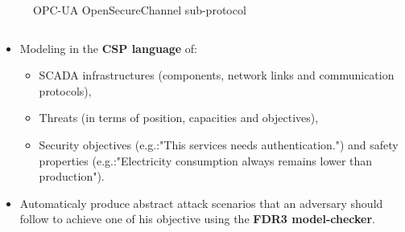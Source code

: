 \documentclass{beamer}
\newcommand{\opcua}{OPC-UA\xspace}
\newcommand{\eg}{e.g.:\xspace}
\begin{document}
\begin{frame}[fragile]{}
\begin{tcolorbox}[adjusted title={\centering\large Formal Analysis of SCADA Protocols}]
\begin{columns}[T]
\begin{column}{.65\textwidth}
\begin{tcolorbox}
\begin{columns}[T]
\begin{column}{.55\textwidth}
\begin{figure}[htb]
                                \caption{\opcua OpenSecureChannel sub-protocol}
                            \end{figure}
                        \end{column}
                    \end{columns}
                \end{tcolorbox}
            \end{column}
        \end{columns}
    \end{tcolorbox}
    \vfill
    \begin{tcolorbox}[adjusted title={\centering\large Smart-Fuzzing of SCADA Systems}]
        \vspace{.5em}
        \begin{columns}[T]
            \begin{column}{.35\textwidth}
                \begin{tcolorbox}[
                colback=white, %
                colframe=normalTitleBlockColor, %
                colframe=gray!20, %
                boxrule=1mm,
                coltext=black, %
                coltitle=black, %
                bottom=2mm,
                equal height group=C,
                valign = center,
                adjusted title={\large Objectives}]
                    \vspace{.5em}
                    \begin{itemize}
                        \item Modeling in the {\bf CSP language} of:
                        \begin{itemize}
                            \item SCADA infrastructures (components, network links and communication protocols),
                            \item Threats (in terms of position, capacities and objectives),
                            \item Security objectives (\eg "This services needs authentication.") and safety properties (\eg "Electricity consumption always remains lower than production").
                        \end{itemize}
                        \item Automaticaly produce abstract attack scenarios that an adversary should follow to achieve one of his objective using the {\bf FDR3 model-checker}.

\end{itemize}
\end{tcolorbox}
\end{column}
\end{columns}
\end{tcolorbox}
\end{frame}
\end{document}
